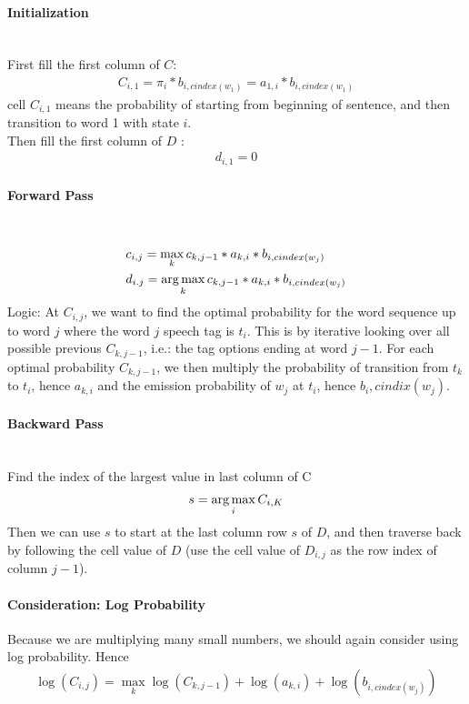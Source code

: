 \paragraph{Initialization} \mbox{}\\
First fill the first column of $C$: 
    \begin{align*}
        C_{i,1} = \pi_i * b_{i, cindex(w_1)} = a_{1,i} * b_{i, cindex(w_1)}
    \end{align*}
cell $C_{i,1}$ means the probability of starting from beginning of sentence, and then transition to word 1 with state $i$. \\
Then fill the first column of $D$ : 
    \begin{align*}
        d_{i,1} = 0
    \end{align*}


\paragraph{Forward Pass} \mbox{}\\
    \begin{align*}
        & c_{i,j} = \max_k c_{k, j-1} * a_{k,i} * b_{i, cindex(w_j)}\\
        & d_{i.j} = \operatorname*{arg\,max}_k  c_{k, j-1} * a_{k,i} * b_{i, cindex(w_j)}\\
    \end{align*}
Logic: At $C_{i,j}$, we want to find the optimal probability for the word sequence up to word $j$ where the word $j$ speech tag is $t_i$. This is by iterative looking over all possible previous $C_{k,j-1}$, i.e.: the tag options ending at word $j-1$. For each optimal probability $C_{k, j-1}$, we then multiply the probability of transition from $t_k$ to $t_{i}$, hence $a_{k,i}$ and the emission probability of $w_j$ at $t_i$, hence $b_i, cindix(w_j)$. 

\paragraph{Backward Pass} \mbox{}\\
Find the index of the largest value in last column of C
    \begin{align*}
        s = \operatorname*{arg\,max}_i C_{i, K} 
    \end{align*}
Then we can use $s$ to start at the last column row $s$ of $D$, and then traverse back by following the cell value of $D$ (use the cell value of $D_{i,j}$ as the row index of column $j-1$). 

\paragraph{Consideration: Log Probability}
Because we are multiplying many small numbers, we should again consider using log probability. Hence 
    \begin{align*}
        \log(C_{i,j}) = \max_k \log(C_{k, j-1}) + \log(a_{k,i}) + \log(b_{i, cindex(w_j)})
    \end{align*}




